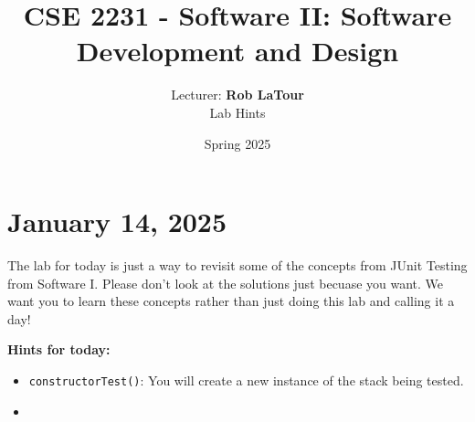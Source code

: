 \documentclass[11pt]{article}
\title{CSE 2231 - Software II: Software Development and Design}
\author{Lecturer: \textbf{Rob LaTour}\\Lab Hints}
\date{Spring 2025}
\begin{document}
\maketitle


\section{January 14, 2025}
The lab for today is just a way to revisit some of the concepts from JUnit
Testing from Software I. Please don't look at the solutions just becuase you
want. We want you to learn these concepts rather than just doing this lab and
calling it a day!

\textbf{Hints for today:}
\begin{itemize}
    \item \texttt{constructorTest()}: You will create a new instance of the stack being tested.
    \item \texttt{}~
\end{itemize}
\end{document}
